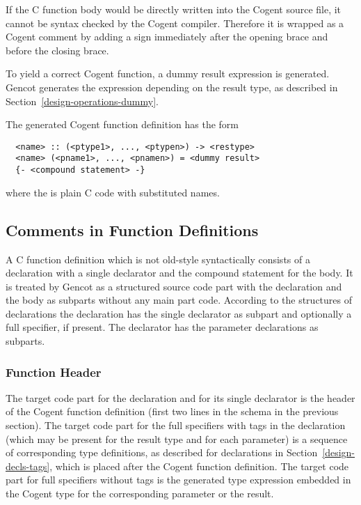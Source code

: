 If the C function body would be directly written into the Cogent source file, it cannot be syntax checked by the 
Cogent compiler. Therefore it is wrapped as a Cogent comment by adding a \code{-} sign immediately after the
opening brace and before the closing brace.

To yield a correct Cogent function, a dummy result expression is generated. Gencot generates the expression
depending on the result type, as described in Section~\ref{design-operations-dummy}. 

The generated Cogent function definition has the form
\begin{verbatim}
  <name> :: (<ptype1>, ..., <ptypen>) -> <restype>
  <name> (<pname1>, ..., <pnamen>) = <dummy result>
  {- <compound statement> -}
\end{verbatim}
where the  is plain C code with substituted names.

\subsection{Comments in Function Definitions}
\label{design-fundefs-comments}

A C function definition which is not old-style syntactically consists of a declaration with a single declarator
and the compound statement for the body.
It is treated by Gencot as a structured source code part with the declaration and the body as subparts
without any main part code. According to the structures of declarations the declaration has the single declarator as subpart
and optionally a full specifier, if present. The declarator has the parameter declarations as subparts.

\subsubsection{Function Header}

The target code part for the declaration and for its single declarator is the header of the Cogent function definition
(first two lines in the schema in the previous section). The target code part for the full specifiers with tags in
the declaration (which may be present for the result type and for each parameter) is a sequence of corresponding 
type definitions, as described for declarations in Section~\ref{design-decls-tags}, which is placed 
after the Cogent function definition. The target code part for full specifiers without tags is the generated type
expression embedded in the Cogent type for the corresponding parameter or the result.

